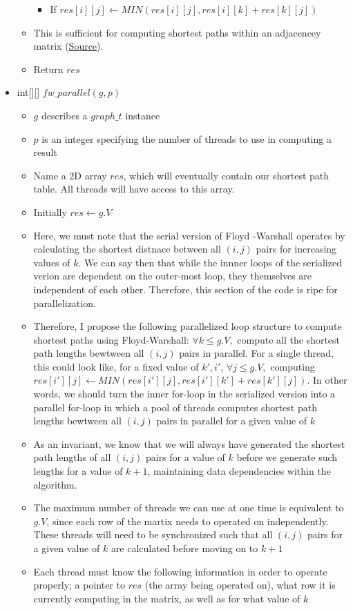 \documentclass[]{article}
\begin{document}
\begin{itemize}
\begin{itemize}
		\begin{itemize}
			\item If $res[i][j] \leftarrow MIN(res[i][j], res[i][k] +res[k][j])$ 
		\end{itemize}
		\item This is sufficient for computing shortest paths within an adjacencey matrix (\href{https://en.wikipedia.org/wiki/Floyd%E2%80%93Warshall_algorithm}{Source}).
			\item Return $res$
		\end{itemize}
		\item int[][] $fw\_parallel(g, p)$
		\begin{itemize}
			\item $g$ describes a $graph\_t$ instance
			\item $p$ is an integer specifying the number of threads to use in computing a result
			\item Name a 2D array $res$, which will  eventually contain our shortest path table. All threads will have access to this array.
			\item Initially $res \leftarrow g.V$
			\item Here, we must note that the serial version of Floyd -Warshall operates by calculating the shortest distnace between all $(i, j)$ pairs for increasing values of $k$. We can say then that while the innner loops of the serialized verion are dependent on the outer-most loop, they themselves are independent of each other. Therefore, this section of the code is ripe for parallelization.
			\item Therefore, I propose the following parallelized loop structure to compute shortest paths using Floyd-Warshall: $\forall k \leq g.V,$ compute all the shortest path lengths bewtween all $(i, j)$ pairs in parallel. For a single thread, this could look like, for a fixed value of $k', i'$, $\forall j \leq g.V,$ computing $res[i'][j] \leftarrow MIN(res[i'][j], res[i'][k'] +res[k'][j])$. In other words, we should turn the inner for-loop in the serialized version into a parallel for-loop in which a pool of threads computes shortest path lengths bewtween all $(i, j)$ pairs in parallel for a given value of $k$
			\item As an invariant, we know that we will always have generated the shortest path lengths of all $(i,j)$ pairs for a value of $k$ before we generate such lengths for a value of $k + 1$, maintaining data dependencies within the algorithm.
			\item The maximum number of threads we can use at one time is equivalent to $g.V$, since each row of the martix needs to operated on independently. These threads will need to be synchronized such that all $(i,j)$ pairs for a given value of $k$ are calculated before moving on to $k + 1$
			\item Each thread must know the following information in order to operate properly; a pointer to $res$ (the array being operated on), what row it is currently computing in the matrix, as well as for what value of $k$
		\end{itemize}
	\end{itemize}
	
\end{document}
